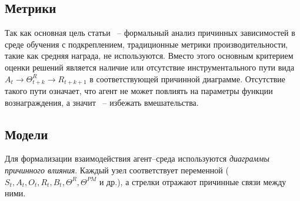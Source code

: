 \subsection{Метрики}

Так как основная цель статьи ~-- формальный анализ причинных зависимостей в среде обучения с подкреплением, традиционные метрики производительности, такие как средняя награда, не используются. Вместо этого основным критерием оценки решений является наличие или отсутствие инструментального пути вида $A_t \to \Theta^R_{t+k} \to R_{t+k+1}$ в соответствующей причинной диаграмме. Отсутствие такого пути означает, что агент не может повлиять на параметры функции вознаграждения, а значит ~-- избежать вмешательства.

\subsection{Модели}

Для формализации взаимодействия агент–среда используются \emph{диаграммы причинного влияния}. Каждый узел соответствует переменной ($S_t, A_t, O_t, R_t, B_t, \Theta^R, \Theta^{PM}$ и др.), а стрелки отражают причинные связи между ними.
